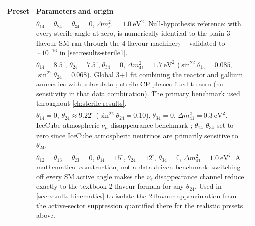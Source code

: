 \begin{implbox}
\begin{center}
\small
\begin{tabular}{@{}ll@{}}
\toprule
Preset & Parameters and origin \\
\midrule
\parbox[t]{3.4cm}{} &
  \parbox[t]{9.2cm}{$\theta_{14}=\theta_{24}=\theta_{34}=0$,
  $\Delta m^2_{41}=1.0\ \mathrm{eV^2}$. Null-hypothesis reference: with
  every sterile angle at zero,  is numerically
  identical to the plain 3-flavour SM run through the 4-flavour machinery
  -- validated to $\sim10^{-16}$ in \cref{sec:results-sterile1}.} \\[26pt]
\parbox[t]{3.4cm}{} &
  \parbox[t]{9.2cm}{$\theta_{14}=8.5^\circ$, $\theta_{24}=7.5^\circ$,
  $\theta_{34}=0$, $\Delta m^2_{41}=1.7\ \mathrm{eV^2}$
  ($\sin^22\theta_{14}=0.085$, $\sin^22\theta_{24}=0.068$). Global 3+1 fit
  combining the reactor and gallium anomalies with solar data
  \parencite{GariazzoGiuntiLavederLi2017}; sterile CP phases fixed to zero
  (no sensitivity in that data combination). The primary benchmark used
  throughout \cref{ch:sterile-results}.} \\[34pt]
\parbox[t]{3.4cm}{} &
  \parbox[t]{9.2cm}{$\theta_{14}=0$, $\theta_{24}\approx9.22^\circ$
  ($\sin^22\theta_{24}=0.10$), $\theta_{34}=0$,
  $\Delta m^2_{41}=0.3\ \mathrm{eV^2}$. IceCube atmospheric $\nu_\mu$
  disappearance benchmark \parencite{IceCube2020SterileNumuDisappearance};
  $\theta_{14},\theta_{34}$ set to zero since IceCube atmospheric neutrinos
  are primarily sensitive to $\theta_{24}$.} \\[26pt]
\parbox[t]{3.4cm}{} &
  \parbox[t]{9.2cm}{$\theta_{12}=\theta_{13}=\theta_{23}=0$,
  $\theta_{14}=15^\circ$, $\theta_{24}=12^\circ$, $\theta_{34}=0$,
  $\Delta m^2_{41}=1.0\ \mathrm{eV^2}$. A mathematical construction, not a
  data-driven benchmark: switching off every SM active angle makes the
  $\nu_e$ disappearance channel reduce exactly to the textbook 2-flavour
  formula for any $\theta_{24}$. Used in \cref{sec:results-kinematics} to
  isolate the 2-flavour approximation from the active-sector suppression
  quantified there for the realistic presets above.} \\[40pt]
\bottomrule
\end{tabular}
\end{center}
\end{implbox}

